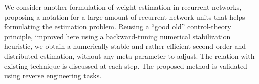 We consider another formulation of weight estimation in recurrent networks, proposing a notation for a large amount of recurrent network units that helps formulating the estimation problem. Reusing a ``good old'' control-theory principle, improved here using a backward-tuning numerical stabilization heuristic, we obtain a numerically stable and rather efficient second-order and distributed estimation, without any meta-parameter to adjust. The relation with existing technique is discussed at each step. 
The proposed method is validated using reverse engineering tasks.

